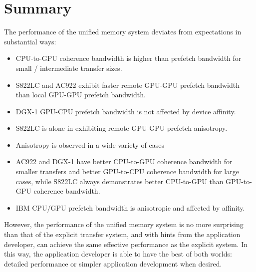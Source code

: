 \section{Summary}

The performance of the unified memory system deviates from expectations in substantial ways:
\begin{itemize}
\item CPU-to-GPU coherence bandwidth is higher than prefetch bandwidth for small / intermediate transfer sizes.
\item S822LC and AC922 exhibit faster remote GPU-GPU prefetch bandwidth than local GPU-GPU prefetch bandwidth.
\item DGX-1 GPU-CPU prefetch bandwidth is not affected by device affinity.
\item S822LC is alone in exhibiting remote GPU-GPU prefetch anisotropy.
\item Anisotropy is observed in a wide variety of cases
\item AC922 and DGX-1 have better CPU-to-GPU coherence bandwidth for smaller transfers and better GPU-to-CPU coherence bandwidth for large cases, while S822LC always demonstrates better CPU-to-GPU than GPU-to-GPU coherence bandwidth.
\item IBM CPU/GPU prefetch bandwidth is anisotropic and affected by affinity.
\end{itemize}
However, the performance of the unified memory system is no more surprising than that of the explicit transfer system, and with hints from the application developer, can achieve the same effective performance as the explicit system.
In this way, the application developer is able to have the best of both worlds: detailed performance or simpler application development when desired.